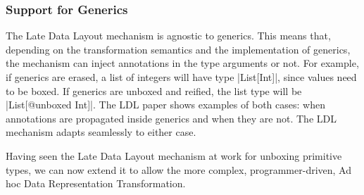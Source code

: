 \subsubsection*{Support for Generics}

The Late Data Layout mechanism is agnostic to generics. This means that, depending on the transformation semantics and the implementation of generics, the mechanism can inject annotations in the type arguments or not. For example, if generics are erased, a list of integers will have type |List[Int]|, since values need to be boxed. If generics are unboxed and reified, the list type will be |List[@unboxed Int]|. The LDL paper \cite{ldl} shows examples of both cases: when annotations are propagated inside generics and when they are not. The LDL mechanism adapts seamlessly to either case.

Having seen the Late Data Layout mechanism at work for unboxing primitive types, we can now extend it to allow the more complex, programmer-driven, Ad hoc Data Representation Transformation.
